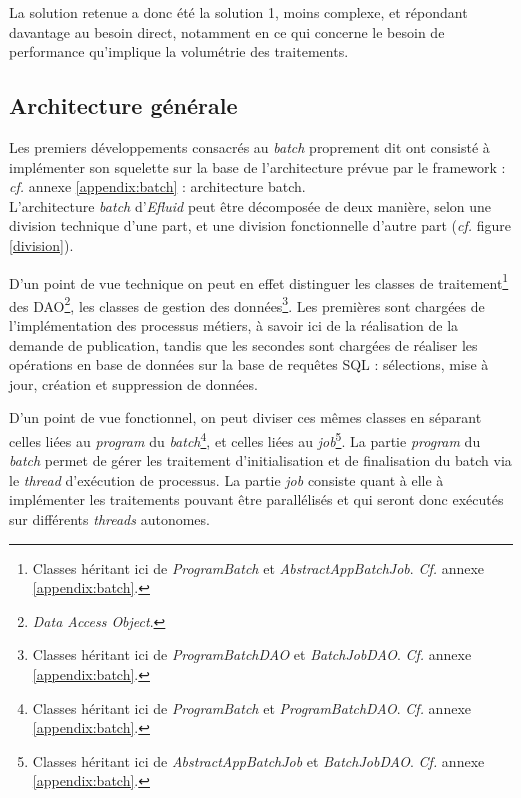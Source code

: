 \documentclass[a4paper, 12pt]{report}
\begin{document}
La solution retenue a donc été la solution 1, moins complexe, et répondant davantage au besoin direct, notamment en ce qui concerne le besoin de performance qu’implique la volumétrie des traitements.

\subsection{Architecture générale}

Les premiers développements consacrés au \textit{batch} proprement dit ont consisté à implémenter son squelette sur la base de l'architecture prévue par le framework : \textit{cf.} annexe \ref{appendix:batch} : architecture batch.\\

L'architecture \textit{batch} d'\textit{Efluid} peut être décomposée de deux manière, selon une division technique d'une part, et une division fonctionnelle d'autre part (\textit{cf.} figure \ref{division}).

D'un point de vue technique on peut en effet distinguer les classes de traitement\footnote{Classes héritant ici de \textit{ProgramBatch} et \textit{AbstractAppBatchJob}. \textit{Cf.} annexe \ref{appendix:batch}.} des DAO\footnote{\textit{Data Access Object}.}, les classes de gestion des données\footnote{Classes héritant ici de \textit{ProgramBatchDAO} et \textit{BatchJobDAO}. \textit{Cf.} annexe \ref{appendix:batch}.}. Les premières sont chargées de l'implémentation des processus métiers, à savoir ici de la réalisation de la demande de publication, tandis que les secondes sont chargées de réaliser les opérations en base de données sur la base de requêtes SQL : sélections, mise à jour, création et suppression de données.

D'un point de vue fonctionnel, on peut diviser ces mêmes classes en séparant celles liées au \textit{program} du \textit{batch}\footnote{Classes héritant ici de \textit{ProgramBatch} et \textit{ProgramBatchDAO}. \textit{Cf.} annexe \ref{appendix:batch}.}, et celles liées au \textit{job}\footnote{Classes héritant ici de \textit{AbstractAppBatchJob} et \textit{BatchJobDAO}. \textit{Cf.} annexe \ref{appendix:batch}.}. La partie \textit{program} du \textit{batch} permet de gérer les traitement d'initialisation et de finalisation du batch via le \textit{thread} d'exécution de processus. La partie \textit{job} consiste quant à elle à implémenter les traitements pouvant être parallélisés et qui seront donc exécutés sur différents \textit{threads} autonomes.\\
\end{document}
